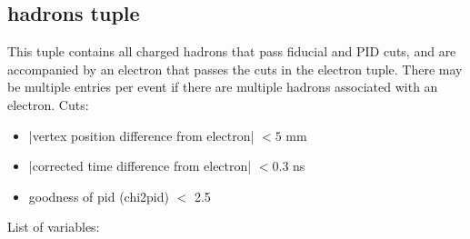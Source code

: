 \documentclass[english]{article}
\begin{document}
\subsection{hadrons tuple} 
This tuple contains all charged hadrons that pass fiducial and PID cuts, and are accompanied by an electron that passes the cuts in the electron tuple.  There may be multiple entries per event if there are multiple hadrons associated with an electron.  
Cuts:
\begin{itemize}
\item |vertex position difference from electron| $<5$ mm
\item |corrected time difference from electron| $<0.3$ ns
\item goodness of pid (chi2pid) $<$ 2.5

\end{itemize}
List of variables:
\end{document}

